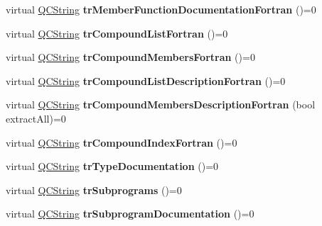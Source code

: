 \begin{DoxyCompactItemize}
\item 
\hypertarget{class_translator_a5641e677e7425ffcf338f396b251a537}{virtual \hyperlink{class_q_c_string}{Q\-C\-String} {\bfseries tr\-Member\-Function\-Documentation\-Fortran} ()=0}\label{class_translator_a5641e677e7425ffcf338f396b251a537}

\item 
\hypertarget{class_translator_a57c8c921f86a651cdaaa9985e4fcc046}{virtual \hyperlink{class_q_c_string}{Q\-C\-String} {\bfseries tr\-Compound\-List\-Fortran} ()=0}\label{class_translator_a57c8c921f86a651cdaaa9985e4fcc046}

\item 
\hypertarget{class_translator_aa45fe80e9abcdd3595d28a5c4b98a1ae}{virtual \hyperlink{class_q_c_string}{Q\-C\-String} {\bfseries tr\-Compound\-Members\-Fortran} ()=0}\label{class_translator_aa45fe80e9abcdd3595d28a5c4b98a1ae}

\item 
\hypertarget{class_translator_a3fd6765aae318c6b248a0775ccf890f7}{virtual \hyperlink{class_q_c_string}{Q\-C\-String} {\bfseries tr\-Compound\-List\-Description\-Fortran} ()=0}\label{class_translator_a3fd6765aae318c6b248a0775ccf890f7}

\item 
\hypertarget{class_translator_ad90eeaec1c8bdff3bdee2dd372d761d7}{virtual \hyperlink{class_q_c_string}{Q\-C\-String} {\bfseries tr\-Compound\-Members\-Description\-Fortran} (bool extract\-All)=0}\label{class_translator_ad90eeaec1c8bdff3bdee2dd372d761d7}

\item 
\hypertarget{class_translator_ab7c4ea8a4cf72479b1291e2cf075edf4}{virtual \hyperlink{class_q_c_string}{Q\-C\-String} {\bfseries tr\-Compound\-Index\-Fortran} ()=0}\label{class_translator_ab7c4ea8a4cf72479b1291e2cf075edf4}

\item 
\hypertarget{class_translator_a8daac78ae6c1f46306ca9c641b58074f}{virtual \hyperlink{class_q_c_string}{Q\-C\-String} {\bfseries tr\-Type\-Documentation} ()=0}\label{class_translator_a8daac78ae6c1f46306ca9c641b58074f}

\item 
\hypertarget{class_translator_a83b9a5964194bb332af838ca0c376063}{virtual \hyperlink{class_q_c_string}{Q\-C\-String} {\bfseries tr\-Subprograms} ()=0}\label{class_translator_a83b9a5964194bb332af838ca0c376063}

\item 
\hypertarget{class_translator_ae113ea0b791f5e127d09bbd29f875617}{virtual \hyperlink{class_q_c_string}{Q\-C\-String} {\bfseries tr\-Subprogram\-Documentation} ()=0}\label{class_translator_ae113ea0b791f5e127d09bbd29f875617}


\end{DoxyCompactItemize}
